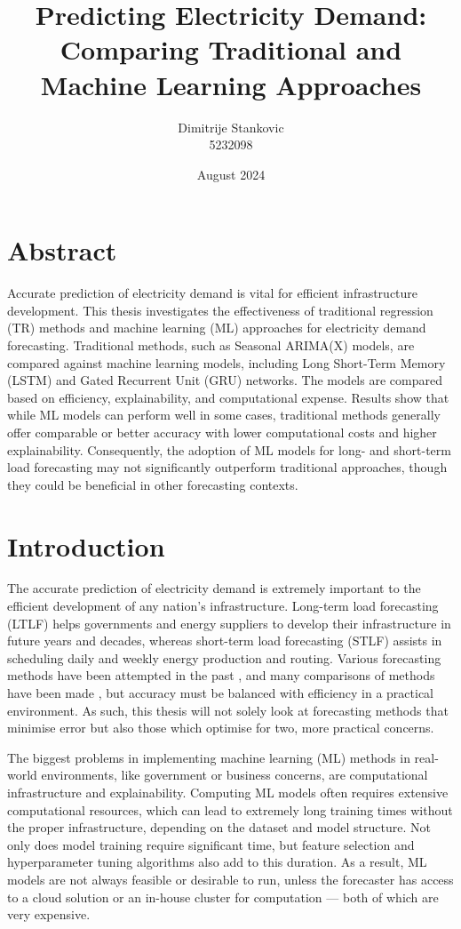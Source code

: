 \documentclass[12pt]{scrreprt}
\title{
    \textbf{
    Predicting Electricity Demand:\\
    Comparing Traditional and Machine Learning Approaches
    }
}
\author{
    {\Large Dimitrije Stankovic}\\
    {\small 5232098}
}
\affil{University of Aberdeen}
\date{August 2024}
\begin{document}
\maketitle

\tableofcontents

\chapter*{Abstract}
Accurate prediction of electricity demand is vital for efficient infrastructure development. This thesis investigates the effectiveness of traditional regression (TR) methods and machine learning (ML) approaches for electricity demand forecasting. Traditional methods, such as Seasonal ARIMA(X) models, are compared against machine learning models, including Long Short-Term Memory (LSTM) and Gated Recurrent Unit (GRU) networks. The models are compared based on efficiency, explainability, and computational expense. Results show that while ML models can perform well in some cases, traditional methods generally offer comparable or better accuracy with lower computational costs and higher explainability. Consequently, the adoption of ML models for long- and short-term load forecasting may not significantly outperform traditional approaches, though they could be beneficial in other forecasting contexts.

\chapter{Introduction}

The accurate prediction of electricity demand is extremely important to the efficient development of any nation’s infrastructure. Long-term load forecasting (LTLF) helps governments and energy suppliers to develop their infrastructure in future years and decades, whereas short-term load forecasting (STLF) assists in scheduling daily and weekly energy production and routing. Various forecasting methods have been attempted in the past \cite{Nti20, Chung22, Gao23}, and many comparisons of methods have been made \cite{Nti20, Gao23, Chung14}, but accuracy must be balanced with efficiency in a practical environment. As such, this thesis will not solely look at forecasting methods that minimise error but also those which optimise for two, more practical concerns.

The biggest problems in implementing machine learning (ML) methods in real-world environments, like government or business concerns, are computational infrastructure and explainability. Computing ML models often requires extensive computational resources, which can lead to extremely long training times without the proper infrastructure, depending on the dataset and model structure. Not only does model training require significant time, but feature selection and hyperparameter tuning algorithms also add to this duration. As a result, ML models are not always feasible or desirable to run, unless the forecaster has access to a cloud solution or an in-house cluster for computation --- both of which are very expensive.
\end{document}
